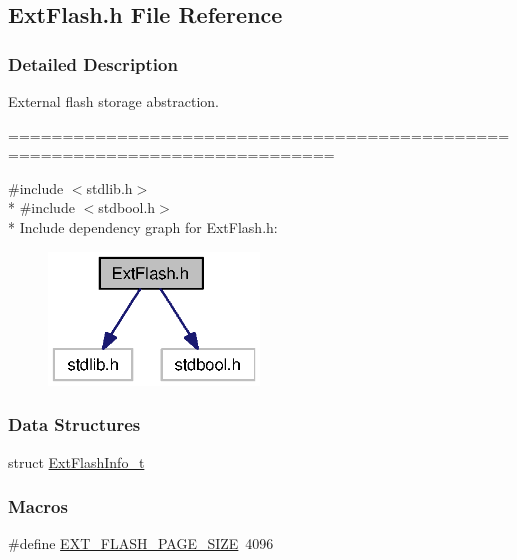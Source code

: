 \subsection{Ext\+Flash.\+h File Reference}
\label{_ext_flash_8h}


\subsubsection{Detailed Description}
External flash storage abstraction. 

============================================================================



{\ttfamily \#include $<$stdlib.\+h$>$}\\*
{\ttfamily \#include $<$stdbool.\+h$>$}\\*
Include dependency graph for Ext\+Flash.\+h\+:
\nopagebreak
\begin{figure}[H]
\begin{center}
\leavevmode
\includegraphics[width=159pt]{_ext_flash_8h__incl}
\end{center}
\end{figure}
\subsubsection*{Data Structures}
\begin{DoxyCompactItemize}
\item 
struct \hyperlink{struct_ext_flash_info__t}{Ext\+Flash\+Info\+\_\+t}
\end{DoxyCompactItemize}
\subsubsection*{Macros}
\begin{DoxyCompactItemize}
\item 
\#define \hyperlink{_ext_flash_8h_a0bc5316ab502ed58a098eef500545d88}{E\+X\+T\+\_\+\+F\+L\+A\+S\+H\+\_\+\+P\+A\+G\+E\+\_\+\+S\+I\+Z\+E}~4096
\end{DoxyCompactItemize}
